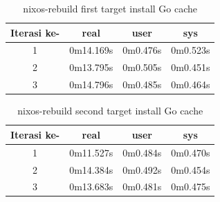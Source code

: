 \documentclass[10pt,twoside]{report}
\begin{document}
\begin{adjustwidth}{20pt}{}
	\begin{table}[H]
		\caption{nixos-rebuild first target install Go cache}
		\begin{center}
			\begin{tabular}[c]{|c|c|c|c|}
				\hline
				\multicolumn{1}{|c|}{\textbf{Iterasi ke-}} &
				\multicolumn{1}{c|}{\textbf{real}}         &
				\multicolumn{1}{c|}{\textbf{user}}         &
				\multicolumn{1}{c|}{\textbf{sys}}                                            \\
				\hline
				1                                          & 0m14.169s & 0m0.476s & 0m0.523s \\
				\hline
				2                                          & 0m13.795s & 0m0.505s & 0m0.451s \\
				\hline
				3                                          & 0m14.796s & 0m0.485s & 0m0.464s \\
				\hline
			\end{tabular}
		\end{center}
	\end{table}
	\vspace{-5mm}
	\begin{table}[H]
		\caption{nixos-rebuild second target install Go cache}
		\begin{center}
			\begin{tabular}[c]{|c|c|c|c|}
				\hline
				\multicolumn{1}{|c|}{\textbf{Iterasi ke-}} &
				\multicolumn{1}{c|}{\textbf{real}}         &
				\multicolumn{1}{c|}{\textbf{user}}         &
				\multicolumn{1}{c|}{\textbf{sys}}                                            \\
				\hline
				1                                          & 0m11.527s & 0m0.484s & 0m0.470s \\
				\hline
				2                                          & 0m14.384s & 0m0.492s & 0m0.454s \\
				\hline
				3                                          & 0m13.683s & 0m0.481s & 0m0.475s \\
				\hline
			\end{tabular}
		\end{center}
	\end{table}

\end{adjustwidth}
\end{document}
